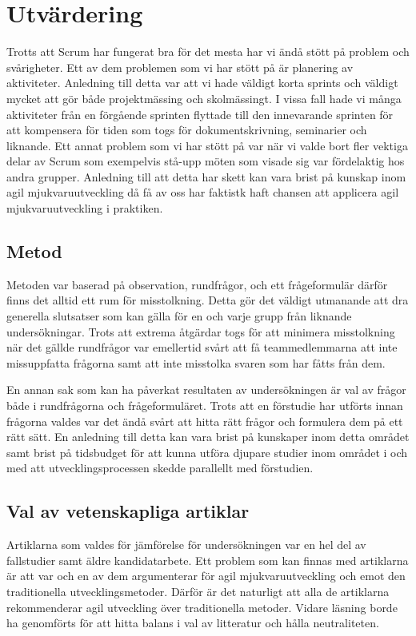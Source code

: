 \section{Utvärdering}
Trotts att Scrum har fungerat bra för det mesta har vi ändå stött på problem och svårigheter. Ett av dem problemen som vi har stött på är planering av aktiviteter. Anledning till detta var att vi hade väldigt korta sprints och väldigt mycket att gör både projektmässing och skolmässingt. I vissa fall hade vi många aktiviteter från en förgående sprinten flyttade till den innevarande sprinten för att kompensera för tiden som togs för dokumentskrivning, seminarier och liknande. Ett annat problem som vi har stött på var när vi valde bort fler vektiga delar av Scrum som exempelvis stå-upp möten som visade sig var fördelaktig hos andra grupper. Anledning till att detta har skett kan vara brist på kunskap inom agil mjukvaruutveckling då få av oss har faktistk haft chansen att applicera agil mjukvaruutveckling i praktiken. 

\subsection{Metod}
Metoden var baserad på observation, rundfrågor, och ett frågeformulär därför finns det alltid ett rum för misstolkning. Detta gör det väldigt utmanande att dra generella slutsatser som kan gälla för en och varje grupp från liknande undersökningar. Trots att extrema åtgärdar togs för att minimera misstolkning när det gällde rundfrågor var emellertid svårt att få teammedlemmarna att inte missuppfatta frågorna samt att inte misstolka svaren som har fåtts från dem. 

En annan sak som kan ha påverkat resultaten av undersökningen är val av frågor både i rundfrågorna och frågeformuläret. Trots att en förstudie har utförts innan frågorna valdes var det ändå svårt att hitta rätt frågor och formulera dem på ett rätt sätt. En anledning till detta kan vara brist på kunskaper inom detta området samt brist på tidsbudget för att kunna utföra djupare studier inom området i och med att utvecklingsprocessen skedde parallellt med förstudien. 

\subsection{Val av vetenskapliga artiklar}
Artiklarna som valdes för jämförelse för undersökningen var en hel del av fallstudier samt äldre kandidatarbete. Ett problem som kan finnas med artiklarna är att var och en av dem argumenterar för agil mjukvaruutveckling och emot den traditionella utvecklingsmetoder. Därför är det naturligt att alla de artiklarna rekommenderar agil utveckling över traditionella metoder. Vidare läsning borde ha genomförts för att hitta balans i val av litteratur och hålla neutraliteten. 
